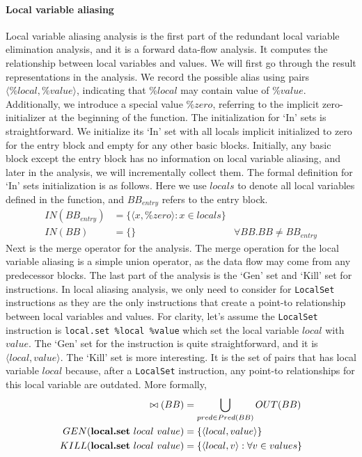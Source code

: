 \paragraph{Local variable aliasing}
Local variable aliasing analysis is the first part of the redundant local variable elimination analysis, and it is a forward data-flow analysis. It computes the relationship between local variables and values. We will first go through the result representations in the analysis. We record the possible alias using pairs $\langle \%local, \%value \rangle$, indicating that $\%local$ may contain value of $\%value$. Additionally, we introduce a special value $\%zero$, referring to the implicit zero-initializer at the beginning of the function. The initialization for `In' sets is straightforward. We initialize its `In' set with all locals implicit initialized to zero for the entry block and empty for any other basic blocks. Initially,  any basic block except the entry block has no information on local variable aliasing, and later in the analysis, we will incrementally collect them. The formal definition for `In' sets initialization is as follows. Here we use $locals$ to denote all local variables defined in the function, and $BB_{entry}$ refers to the entry block.
\begin{align*}
    IN(BB_{entry}) & = \{ \langle x, \%zero \rangle : x \in locals \} &                                 \\
    IN(BB)         & = \{ \}                                          & \forall BB . BB \neq BB_{entry}
\end{align*}
Next is the merge operator for the analysis. The merge operation for the local variable aliasing is a simple union operator, as the data flow may come from any predecessor blocks. The last part of the analysis is the `Gen' set and `Kill' set for instructions. In local aliasing analysis, we only need to consider for \texttt{LocalSet} instructions as they are the only instructions that create a point-to relationship between local variables and values. For clarity, let's assume the \texttt{LocalSet} instruction is \texttt{local.set \%local \%value} which set the local variable $local$ with $value$. The `Gen' set for the instruction is quite straightforward, and it is $\langle local, value \rangle$. The `Kill' set is more interesting. It is the set of pairs that has local variable $local$ because, after a \texttt{LocalSet} instruction, any point-to relationships for this local variable are outdated. More formally,
\begin{align*}
    \bowtie(BB)                                   & =
    \bigcup_{pred \in Pred(BB)} OUT(BB)               \\
    GEN(\text{\textbf{local.set} } local\ value)  & =
    \{ \langle local, value \rangle\}                 \\
    KILL(\text{\textbf{local.set} } local\ value) & =
    \{ \langle local, v \rangle : \forall v \in values \}
\end{align*}
